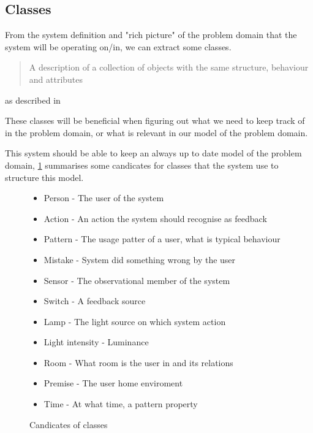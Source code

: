 \subsection{Classes}

From the system definition and "rich picture" of the problem domain that the system will be operating on/in, we can extract some classes. 

\begin{quote}
A description of a collection of objects with the same structure, behaviour and attributes
\end{quote}
as described in \cite{OOAD}

These classes will be beneficial when figuring out what we need to keep track of in the problem domain, or what is relevant in our model of the problem domain.

This system should be able to keep an always up to date model of the problem domain, \cref{lis:classes} summarises some candicates for classes that the system use to structure this model.

\begin{figure}
  \label{lis:classes}
  \begin{itemize}
    \item Person - The user of the system
    \item Action - An action the system should recognise as feedback
    \item Pattern - The usage patter of a user, what is typical behaviour
    \item Mistake - System did something wrong by the user
    \item Sensor - The observational member of the system
    \item Switch - A feedback source
    \item Lamp - The light source on which system action
    \item Light intensity - Luminance
    \item Room - What room is the user in and its relations
    \item Premise - The user home enviroment
    \item Time - At what time, a pattern property
  \end{itemize}
  \caption{Candicates of classes}
\end{figure}
